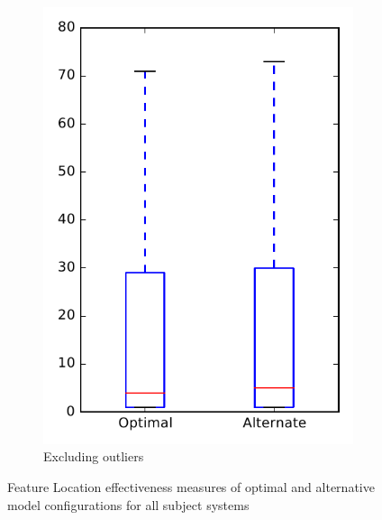 \begin{figure}
\begin{subfigure}{.4\textwidth}
        \includegraphics[height=0.4\textheight]{figures/combo/flt_rq1_overview_no_outlier}
        \caption{Excluding outliers}\label{fig:combo:flt:rq1:overview_no_outlier}
    \end{subfigure}
\caption{Feature Location effectiveness measures of optimal and alternative model configurations for all subject systems}
\label{fig:combo:flt:rq1:overview}
\end{figure}
